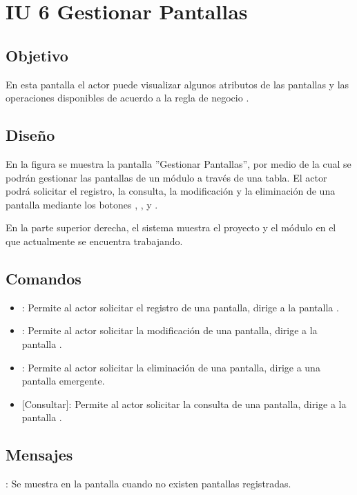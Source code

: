 \section{IU 6 Gestionar Pantallas}

\subsection{Objetivo}
	En esta pantalla el actor puede visualizar algunos atributos de las pantallas y las operaciones disponibles de acuerdo a la regla de negocio .
\subsection{Diseño}
	En la figura  se muestra la pantalla ''Gestionar Pantallas'', por medio de la cual se podrán gestionar las pantallas de un módulo a través de una tabla. El actor podrá solicitar el registro, la consulta, la modificación y la eliminación de una pantalla mediante los botones , , \editar y \eliminar.
	
	En la parte superior derecha, el sistema muestra el proyecto y el módulo en el que actualmente se encuentra trabajando.

\subsection{Comandos}
\begin{itemize}
	\item {}: Permite al actor solicitar el registro de una pantalla, dirige a la pantalla .
	\item \editar [Modificar]: Permite al actor solicitar la modificación de una pantalla, dirige a la pantalla .
	\item \eliminar [Eliminar]: Permite al actor solicitar la eliminación de una pantalla, dirige a una pantalla emergente.
	\item {} [Consultar]: Permite al actor solicitar la consulta de una pantalla, dirige a la pantalla  .
\end{itemize}
\subsection{Mensajes}

\begin{Citemize}
	\item {}: Se muestra en la pantalla  cuando no existen pantallas registradas.
\end{Citemize}
